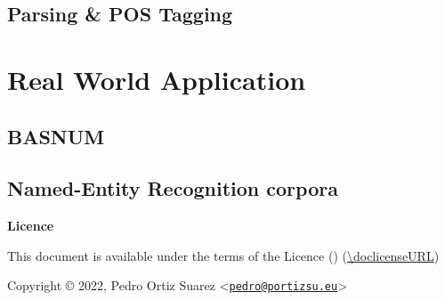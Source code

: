 \documentclass{mimosis}
\begin{document}
\chapter{Parsing \& POS Tagging}


\part{Real World Application}
\chapter{BASNUM}
\chapter{Named-Entity Recognition corpora}


\backmatter

\begingroup
\let\clearpage\relax
\glsaddall
\printglossary[type=\acronymtype]
\newpage
\printglossary
\endgroup

\printindex




\cleardoublepage  %
\thispagestyle{empty}
\begin{center}
	{\Huge\bfseries Licence}

	\vfill
	\Large
	This document is available under the terms of the \doclicenseLongName Licence (\doclicenseName) (\url{\doclicenseURL})

	\vfill
	Copyright © 2022, Pedro Ortiz Suarez <\href{mailto:pedro@portizsu.eu}{\nolinkurl{pedro@portizsu.eu}}>

	\vfill
	\doclicenseImage
\end{center}

\vfill
\end{document}
